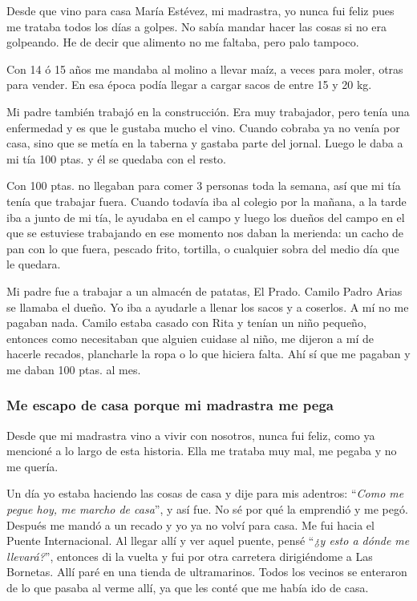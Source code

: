 \documentclass[12pt,a5paper]{book}
\begin{document}
Desde que vino para casa María Estévez, mi madrastra, yo nunca fui feliz pues me trataba todos los días a golpes. No sabía mandar hacer las cosas si no era golpeando. He de decir que alimento no me faltaba, pero palo tampoco.

Con 14 ó 15 años me mandaba al molino a llevar maíz, a veces para moler, otras para vender. En esa época podía llegar a cargar sacos de entre 15 y 20 kg.

Mi padre también trabajó en la construcción. Era muy trabajador, pero tenía una enfermedad y es que le gustaba mucho el vino. Cuando cobraba ya no venía por casa, sino que se metía en la taberna y gastaba parte del jornal. Luego le daba a mi tía 100 ptas. y él se quedaba con el resto.

Con 100 ptas. no llegaban para comer 3 personas toda la semana, así que mi tía tenía que trabajar fuera. Cuando todavía iba al colegio por la mañana, a la tarde iba a junto de mi tía, le ayudaba en el campo y luego los dueños del campo en el que se estuviese trabajando en ese momento nos daban la merienda: un cacho de pan con lo que fuera, pescado frito, tortilla, o cualquier sobra del medio día que le quedara.

Mi padre fue a trabajar a un almacén de patatas, El Prado. Camilo Padro Arias se llamaba el dueño. Yo iba a ayudarle a llenar los sacos y a coserlos. A mí no me pagaban nada. Camilo estaba casado con Rita y tenían un niño pequeño, entonces como necesitaban que alguien cuidase al niño, me dijeron a mí de hacerle recados, plancharle la ropa o lo que hiciera falta. Ahí sí que me pagaban y me daban 100 ptas. al mes.


\subsubsection*{Me escapo de casa porque mi madrastra me pega}

Desde que mi madrastra vino a vivir con nosotros, nunca fui feliz, como ya mencioné a lo largo de esta historia. Ella me trataba muy mal, me pegaba y no me quería.

Un día yo estaba haciendo las cosas de casa y dije para mis adentros: ``\textit{Como me pegue hoy, me marcho de casa}'', y así fue. No sé por qué la emprendió y me pegó. Después me mandó a un recado y yo ya no volví para casa. Me fui hacia el Puente Internacional. Al llegar allí y ver aquel puente, pensé ``\textit{¿y esto a dónde me llevará?}'', entonces di la vuelta y fui por otra carretera dirigiéndome a Las Bornetas. Allí paré en una tienda de ultramarinos. Todos los vecinos se enteraron de lo que pasaba al verme allí, ya que les conté que me había ido de casa.
\end{document}
